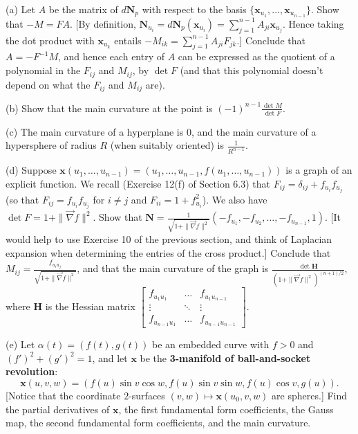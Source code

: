 \documentclass[leqno]{book}
\begin{document}
\begin{enumerate}
(a) Let $A$ be the matrix of $d\mathbf N_p$ with respect to the basis $\{\mathbf x_{u_1},\dots,\mathbf x_{u_{n-1}}\}$.  Show that $-M=FA$.  [By definition, $\mathbf N_{u_i}=d\mathbf N_p(\mathbf x_{u_i})=\sum_{j=1}^{n-1}A_{ji}\mathbf x_{u_j}$.  Hence taking the dot product with $\mathbf x_{u_k}$ entails $-M_{ik}=\sum_{j=1}^{n-1}A_{ji}F_{jk}$.]  Conclude that $A=-F^{-1}M$, and hence each entry of $A$ can be expressed as the quotient of a polynomial in the $F_{ij}$ and $M_{ij}$, by $\det F$ (and that this polynomial doesn't depend on what the $F_{ij}$ and $M_{ij}$ are). %

(b) Show that the main curvature at the point is $(-1)^{n-1}\frac{\det M}{\det F}$.

(c) The main curvature of a hyperplane is $0$, and the main curvature of a hypersphere of radius $R$ (when suitably oriented) is $\frac 1{R^{n-1}}$.

(d) Suppose $\mathbf x(u_1,\dots,u_{n-1})=(u_1,\dots,u_{n-1},f(u_1,\dots,u_{n-1}))$ is a graph of an explicit function.  We recall (Exercise 12(f) of Section 6.3) that $F_{ij}=\delta_{ij}+f_{u_i}f_{u_j}$ (so that $F_{ij}=f_{u_i}f_{u_j}$ for $i\ne j$ and $F_{ii}=1+f_{u_i}^2$).  We also have $\det F=1+\|\vec\nabla f\|^2$.  Show that $\mathbf N=\frac 1{\sqrt{1+\|\vec\nabla f\|^2}}(-f_{u_1},-f_{u_2},\dots,-f_{u_{n-1}},1)$. [It would help to use Exercise 10 of the previous section, and think of Laplacian expansion when determining the entries of the cross product.]  Conclude that $M_{ij}=\frac{f_{u_iu_j}}{\sqrt{1+\|\vec\nabla f\|^2}}$, and that the main curvature of the graph is $\frac{\det\mathbf H}{(1+\|\vec\nabla f\|^2)^{(n+1)/2}}$, where $\mathbf H$ is the Hessian matrix $\begin{bmatrix}f_{u_1u_1}&\dots&f_{u_1u_{n-1}}\\\vdots&\ddots&\vdots\\f_{u_{n-1}u_1}&\dots&f_{u_{n-1}u_{n-1}}\end{bmatrix}$.

(e) Let $\alpha(t)=(f(t),g(t))$ be an embedded curve with $f>0$ and $(f')^2+(g')^2=1$, and let $\mathbf x$ be the \textbf{3-manifold of ball-and-socket revolution}:
$$\mathbf x(u,v,w)=(f(u)\sin v\cos w,f(u)\sin v\sin w,f(u)\cos v,g(u)).$$
[Notice that the coordinate $2$-surfaces $(v,w)\mapsto\mathbf x(u_0,v,w)$ are spheres.]  Find the partial derivatives of $\mathbf x$, the first fundamental form coefficients, the Gauss map, the second fundamental form coefficients, and the main curvature.
\end{enumerate}
\end{document}
